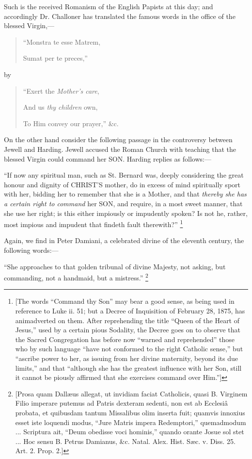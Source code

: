 Such is the received Romanism of the English
Papists at this day; and accordingly Dr. Challoner has translated the
famous words in the office of the blessed Virgin,—

\begin{quote}

``Monstra
te esse Matrem,

Sumat per te preces,''
\end{quote}

by

\begin{quote}

``Exert
the \emph{Mother's care},

And us \emph{thy children} own,

To Him convey our prayer,'' \&c.

\end{quote}

On the other hand consider the following passage
in the controversy between Jewell and Harding. Jewell accused the
Roman Church with teaching that the blessed Virgin could command her SON. Harding replies as follows:—

``If
now any spiritual man, such as St. Bernard was, deeply considering the
great honour and dignity of CHRIST'S
mother, do in excess of mind spiritually sport with her, bidding her
to remember that she is a Mother, and that \emph{thereby she has a
certain right to command} her SON, and
require, in a most sweet manner, that she use her right; is this
either impiously or impudently spoken? Is not he, rather, most impious
and impudent that findeth fault therewith?'' \footnote{[The words ``Command thy Son'' may bear a good sense, as being used in
reference to Luke ii. 51; but a Decree of Inquisition of February 28,
1875, has animadverted on them. After reprehending the title ``Queen of
the Heart of Jesus,'' used by a certain pious Sodality, the Decree goes
on to observe that the Sacred Congregation has before now ``warned and
reprehended'' those who by such language ``have not conformed to the
right Catholic sense,'' but ``ascribe power to her, as issuing from her
divine maternity, beyond its due limits,'' and that ``although she has
the greatest influence with her Son, still it cannot be piously
affirmed that she exercises command over Him.'']}

Again, we find in Peter Damiani, a celebrated
divine of the eleventh century, the following words:—

``She
approaches to that golden tribunal of divine Majesty, not asking, but
commanding, not a handmaid, but a mistress.'' \footnote{[Prosa quam Dallæus allegat, ut invidiam faciat Catholicis, quasi B.
Virginem Filio imperare putemus ad Patris dexteram sedenti, non est ab
Ecclesiâ probata, et quibusdam tantum Missalibus olim inserta fuit;
quamvis innoxius esset iste loquendi modus, ``Jure Matris impera
Redemptori,'' quemadmodum ... Scriptura ait, ``Deum obedisse voci
hominis,'' quando orante Josue sol stet ... Hoc sensu B. Petrus
Damianus, \&c. Natal. Alex. Hist. Sæc. v. Diss. 25. Art. 2. Prop.
2.]}

